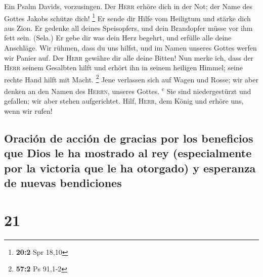  Ein Psalm Davids, vorzusingen.  Der
\textsc{Herr} erhöre dich in der Not; der Name des Gottes Jakobs schütze
dich! \footnote{\textbf{20:2} Spr 18,10}  Er sende dir
Hilfe vom Heiligtum und stärke dich aus Zion.  Er gedenke
all deines Speisopfers, und dein Brandopfer müsse vor ihm fett sein.
(Sela.)  Er gebe dir was dein Herz begehrt, und erfülle
alle deine Anschläge.  Wir rühmen, dass du uns hilfst, und
im Namen unseres Gottes werfen wir Panier auf. Der \textsc{Herr} gewähre
dir alle deine Bitten!  Nun merke ich, dass der
\textsc{Herr} seinem Gesalbten hilft und erhört ihn in seinem heiligen
Himmel; seine rechte Hand hilft mit Macht. \footnote{\textbf{57:2} Ps
  91,1-2}  Jene verlassen sich auf Wagen und Rosse; wir
aber denken an den Namen des \textsc{Herrn}, unseres Gottes.
\textsuperscript{c}  Sie sind niedergestürzt und gefallen;
wir aber stehen aufgerichtet.  Hilf, \textsc{Herr}, dem
König und erhöre uns, wenn wir rufen!

\hypertarget{oraciuxf3n-de-acciuxf3n-de-gracias-por-los-beneficios-que-dios-le-ha-mostrado-al-rey-especialmente-por-la-victoria-que-le-ha-otorgado-y-esperanza-de-nuevas-bendiciones}{%
\subsection{Oración de acción de gracias por los beneficios que Dios le
ha mostrado al rey (especialmente por la victoria que le ha otorgado) y
esperanza de nuevas
bendiciones}\label{oraciuxf3n-de-acciuxf3n-de-gracias-por-los-beneficios-que-dios-le-ha-mostrado-al-rey-especialmente-por-la-victoria-que-le-ha-otorgado-y-esperanza-de-nuevas-bendiciones}}

\hypertarget{section-20}{%
\section{21}\label{section-20}}

